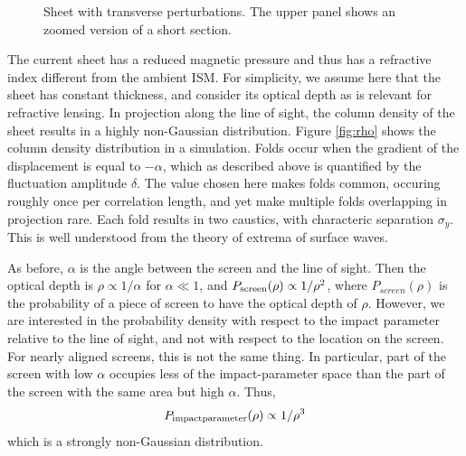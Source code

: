 \documentclass[useAMS,usenatbib]{mn2e}
\begin{document}
\begin{figure}
\vspace{-0.8in}
\centerline{}
\caption{Sheet with transverse perturbations.  The upper panel shows
  an zoomed version of a short section.}
\label{fig:sheet}
\end{figure}

The current sheet has a reduced magnetic pressure and thus has a refractive index different
from the ambient ISM. For simplicity, we assume here that the sheet has constant thickness, and
consider its optical depth as is relevant for refractive lensing.
In projection along the line of sight, the column density of the  sheet 
results in a highly non-Gaussian
distribution. Figure \ref{fig:rho} shows the column density distribution in a
simulation.  Folds occur when the gradient of the displacement is
equal to $-\alpha$, which as described above is quantified by the
fluctuation amplitude $\delta$.  The value chosen here makes folds
common, occuring roughly once per correlation length, and yet make
multiple folds overlapping in projection rare.  Each fold results in
two caustics, with characteric separation $\sigma_y$. This is well
understood from the theory of extrema of surface
waves\citep{1957RSPTA.249..321L}. 

%
% 
As before,  $\alpha$ is the angle between the screen and the line of sight.
Then the optical depth is $\rho\propto1/\alpha$ for
$\alpha\ll 1$, and  $P_{\rm screen}(\rho)\propto 1/\rho^2$, where $P_{screen}(\rho)$
is the probability of a piece of screen to have the optical depth of $\rho$.
However, we are interested in the probability density with respect to the impact parameter relative
to the line of sight, and not with respect to the location on the screen. For nearly aligned screens, this
is not the same thing. In particular, part of the screen with low $\alpha$ occupies less of the
impact-parameter space than the part of the screen with the same area but high $\alpha$. Thus,
\begin{equation}
P_{\rm impact parameter}(\rho)\propto 1/\rho^3
\label{eqn:prho}
\end{equation}
which is a strongly non-Gaussian distribution.
\end{document}

